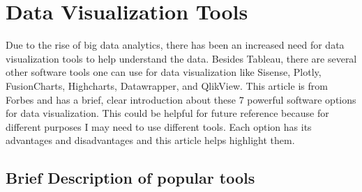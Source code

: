 \documentclass[]{book}
\begin{document}
\hypertarget{data-visualization-tools}{%
\section{Data Visualization Tools}\label{data-visualization-tools}}

Due to the rise of big data analytics, there has been an increased need for data visualization tools to help understand the data. Besides Tableau, there are several other software tools one can use for data visualization like Sisense, Plotly, FusionCharts, Highcharts, Datawrapper, and QlikView. This article is from Forbes and has a brief, clear introduction about these 7 powerful software options for data visualization. This could be helpful for future reference because for different purposes I may need to use different tools. Each option has its advantages and disadvantages and this article helps highlight them.

\hypertarget{brief-description-of-popular-tools}{%
\subsection{Brief Description of popular tools}\label{brief-description-of-popular-tools}}
\end{document}
